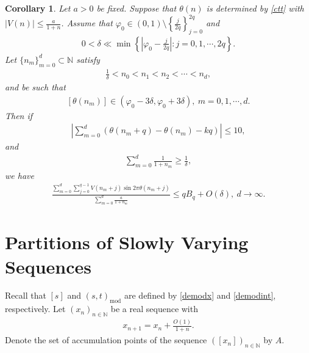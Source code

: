 \documentclass[12pt]{amsart}
\newcommand{\abs}[1]{\left\lvert #1 \right\rvert}
\theoremstyle{plain}
\newtheorem{corollary}[theorem]{Corollary}
\theoremstyle{definition}
\begin{document}
	
	\begin{corollary} \label{zhongyaoyinli}
		Let $a>0$ be fixed.	Suppose that $\theta(n)$ is determined by \eqref{ctt} with $\abs{V(n)}\leq\frac{a}{1+n}$. 
		Assume that $\varphi_0\in (0,1)\setminus \left\{\frac{j}{2q}\right\}_{j=0}^{2q}$ and 
	\begin{align}
	0<\delta\ll \min\left\{\abs{\varphi_0-\frac{j}{2q}}:j=0,1,\cdots,2q\right\}.\nonumber
\end{align} 
Let $\{n_m\}_{m=0}^d\subset\mathbb{N}$ satisfy
		\begin{align}
			\frac{1}{\delta}<n_0<n_1<n_2<\cdots<n_d,\nonumber
		\end{align}
		and be such that
		\begin{align}
			\label{theta0pmvarepsilon}\left[\theta(n_m)\right]\in (\varphi_0-3\delta,\varphi_0+3\delta),\ m=0,1,\cdots,d.
		\end{align}
		Then if
		\begin{align}
			\abs{\sum_{m=0}^d(\theta(n_m+q)-\theta(n_m)-kq)}\leq 10,\label{xydy1}
		\end{align}
		and 
		\begin{align}\label{dayuN}
			\sum_{m=0}^{d}\frac{1}{1+n_{m}}\geq \frac{1}{\delta},
		\end{align}		
		we have 
		\begin{align}\label{bqjia0}
			\frac{\sum_{m=0}^{d}\sum_{j=0}^{q-1}V(n_m+j)\sin2\pi\theta(n_m+j)}{\sum_{m=0}^{d}\frac{a}{1+n_m}}\leq qB_q+O(\delta) ,\ d\to\infty.
		\end{align}
	\end{corollary}

\section{Partitions of Slowly Varying Sequences}\label{sec4}
	Recall that $[s]$ and $(s,t)_{\mathrm{mod}}$ are defined by \eqref{demodx} and \eqref{demodint}, respectively.
Let $(x_n)_{n\in\mathbb{N}}$ be a real sequence with
\begin{align}
		x_{n+1}=x_n+\frac{O(1)}{1+n}.\label{xnbigo1}
	\end{align}
Denote the set of accumulation points of the sequence $(\left[x_n\right])_{n\in\mathbb{N}}$ by $A$. 
\end{document}
